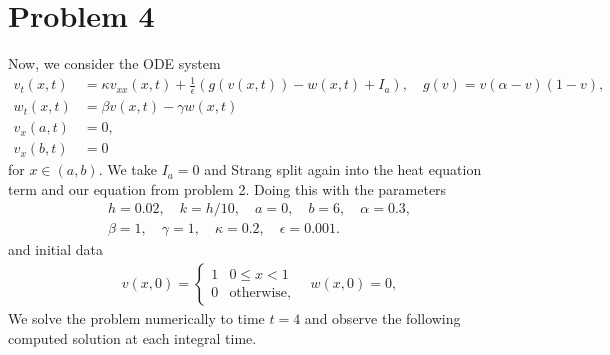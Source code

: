 \documentclass{article}
\begin{document}
\section{Problem 4}
Now, we consider the ODE system
\begin{align*}
	v_t(x,t) &= \kappa v_{xx}(x,t)+  \frac 1 \epsilon \left( g(v(x,t)) - w(x,t) + I_a \right), \quad g(v) = v (\alpha - v) (1-v),\\
	w_t(x,t) &= \beta v(x,t) - \gamma w(x,t)\\
	v_x(a,t) & = 0,\\
	v_x(b,t) & = 0
\end{align*}
for \(x \in (a,b)\). We take $I_a=0$ and Strang split again into the heat equation term and our equation from problem 2. Doing this with the parameters \begin{align*}
	h = 0.02, \quad k = h/10, \quad a = 0, \quad b = 6, \quad \alpha = 0.3,\\
	\beta = 1, \quad \gamma = 1, \quad \kappa = 0.2, \quad \epsilon = 0.001.
\end{align*} and initial data \begin{align*}
	v(x,0) = \begin{cases} 1 &0 \leq x < 1 \\
		0 & \text{otherwise},
	\end{cases} \quad w(x,0) = 0, 
\end{align*}
We solve the problem numerically to time $t=4$ and observe the following computed solution at each integral time. 
\end{document}
